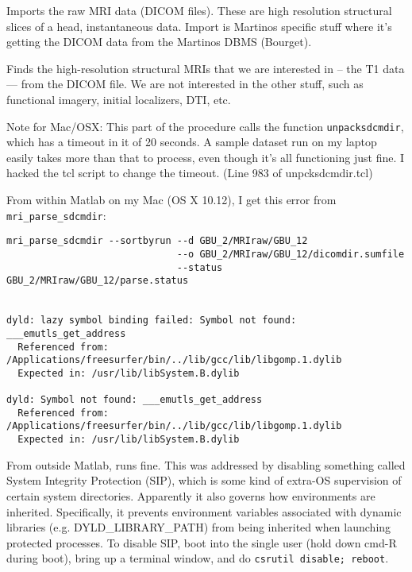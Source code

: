 \documentclass[11pt]{article}
\begin{document}
\begin{itemize}

Imports the raw MRI data (DICOM files). These are high resolution
structural slices of a head, instantaneous data.  Import is Martinos
specific stuff where it's getting the DICOM data from the Martinos
DBMS (Bourget).

 Finds the high-resolution structural MRIs
  that we are interested in -- the T1 data --- from the DICOM file.
  We are not interested in the other
  stuff, such as functional imagery, initial localizers, DTI, etc.


  Note for Mac/OSX: This part of the procedure calls the \fs function
  \verb+unpacksdcmdir+, which has a timeout in it of 20 seconds.  A
  sample dataset run on my laptop easily takes more than that to
  process, even though it's all functioning just fine.  I hacked the
  tcl script to change the timeout. (Line 983 of unpcksdcmdir.tcl)

From within Matlab on my Mac (OS X 10.12), I get this error from \verb+mri_parse_sdcmdir+:

\begin{verbatim}
mri_parse_sdcmdir --sortbyrun --d GBU_2/MRIraw/GBU_12
                              --o GBU_2/MRIraw/GBU_12/dicomdir.sumfile
                              --status GBU_2/MRIraw/GBU_12/parse.status


dyld: lazy symbol binding failed: Symbol not found: ___emutls_get_address
  Referenced from: /Applications/freesurfer/bin/../lib/gcc/lib/libgomp.1.dylib
  Expected in: /usr/lib/libSystem.B.dylib

dyld: Symbol not found: ___emutls_get_address
  Referenced from: /Applications/freesurfer/bin/../lib/gcc/lib/libgomp.1.dylib
  Expected in: /usr/lib/libSystem.B.dylib
\end{verbatim}

From outside Matlab, runs fine.  This was addressed by disabling
something called System Integrity Protection (SIP), which is some kind
of extra-OS supervision of certain system directories.  Apparently it
also governs how environments are inherited.  Specifically, it
prevents environment variables associated with dynamic libraries
(e.g. DYLD\_LIBRARY\_PATH) from being inherited when launching
protected processes.  To disable SIP, boot into the single user (hold
down cmd-R during boot), bring up a terminal window, and do
\verb+csrutil disable; reboot+.



\end{itemize}
\end{document}
